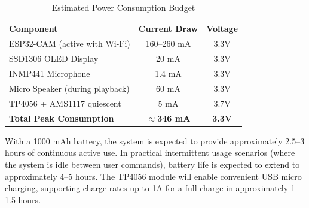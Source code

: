 \begin{table}[h]
\centering
\begin{tabular}{|l|c|c|}
\hline
\textbf{Component} & \textbf{Current Draw} & \textbf{Voltage} \\
\hline
ESP32-CAM (active with Wi-Fi) & 160--260 mA & 3.3V \\
SSD1306 OLED Display & 20 mA & 3.3V \\
INMP441 Microphone & 1.4 mA & 3.3V \\
Micro Speaker (during playback) & 60 mA & 3.3V \\
TP4056 + AMS1117 quiescent & 5 mA & 3.7V \\
\hline
\textbf{Total Peak Consumption} & \textbf{$\approx$346 mA} & \textbf{3.3V} \\
\hline
\end{tabular}
\caption{Estimated Power Consumption Budget}
\end{table}

With a 1000 mAh battery, the system is expected to provide approximately 2.5--3 hours of continuous active use. In practical intermittent usage scenarios (where the system is idle between user commands), battery life is expected to extend to approximately 4--5 hours. The TP4056 module will enable convenient USB micro charging, supporting charge rates up to 1A for a full charge in approximately 1--1.5 hours.
